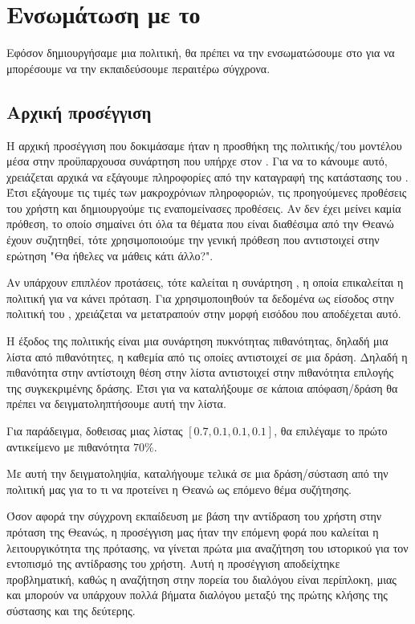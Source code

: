 \section{Ενσωμάτωση με το }

Εφόσον δημιουργήσαμε μια πολιτική, θα πρέπει να την ενσωματώσουμε στο  για να μπορέσουμε να την εκπαιδεύσουμε περαιτέρω σύγχρονα.

\subsection{Αρχική προσέγγιση}

Η αρχική προσέγγιση που δοκιμάσαμε ήταν η προσθήκη της πολιτικής/του μοντέλου μέσα στην προϋπαρχουσα συνάρτηση που υπήρχε στον . Για να το κάνουμε αυτό, χρειάζεται αρχικά να εξάγουμε πληροφορίες από την καταγραφή της κατάστασης του . Έτσι εξάγουμε τις τιμές των μακροχρόνιων πληροφοριών, τις προηγούμενες προθέσεις του χρήστη και δημιουργούμε τις εναπομείνασες προθέσεις. Αν δεν έχει μείνει καμία πρόθεση, το οποίο σημαίνει ότι όλα τα θέματα που είναι διαθέσιμα από την Θεανώ έχουν συζητηθεί, τότε χρησιμοποιούμε την γενική πρόθεση  που αντιστοιχεί στην ερώτηση "Θα ήθελες να μάθεις κάτι άλλο?".

Αν υπάρχουν επιπλέον προτάσεις, τότε καλείται η συνάρτηση , η οποία επικαλείται η πολιτική για να κάνει πρόταση. Για χρησιμοποιηθούν τα δεδομένα ως είσοδος στην πολιτική του , χρειάζεται να μετατραπούν στην μορφή εισόδου που αποδέχεται αυτό.

Η έξοδος της πολιτικής είναι μια συνάρτηση πυκνότητας πιθανότητας, δηλαδή μια λίστα από πιθανότητες, η καθεμία από τις οποίες αντιστοιχεί σε μια δράση. Δηλαδή η πιθανότητα στην αντίστοιχη θέση στην λίστα αντιστοιχεί στην πιθανότητα επιλογής της συγκεκριμένης δράσης. Έτσι για να καταλήξουμε σε κάποια απόφαση/δράση θα πρέπει να δειγματοληπτήσουμε αυτή την λίστα.

Για παράδειγμα, δοθεισας μιας λίστας $[0.7, 0.1, 0.1, 0.1]$, θα επιλέγαμε το πρώτο αντικείμενο με πιθανότητα $70\%$.

Με αυτή την δειγματοληψία, καταλήγουμε τελικά σε μια δράση/σύσταση από την πολιτική μας για το τι να προτείνει η Θεανώ ως επόμενο θέμα συζήτησης.

Όσον αφορά την σύγχρονη εκπαίδευση με βάση την αντίδραση του χρήστη στην πρόταση της Θεανώς, η προσέγγιση μας ήταν την επόμενη φορά που καλείται η λειτουργικότητα της πρότασης, να γίνεται πρώτα μια αναζήτηση του ιστορικού για τον εντοπισμό της αντίδρασης του χρήστη. Αυτή η προσέγγιση αποδείχτηκε προβληματική, καθώς η αναζήτηση στην πορεία του διαλόγου είναι περίπλοκη, μιας και μπορούν να υπάρχουν πολλά βήματα διαλόγου μεταξύ της πρώτης κλήσης της σύστασης και της δεύτερης.

